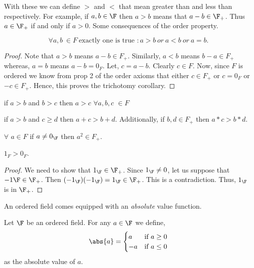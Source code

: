 With these we can define $ > $ and $ < $ that mean greater than and less than
respectively. For example, if $a,b \in \F$ then $ a > b$ means that $a - b \in \F_{+}$. 
Thus $a \in \F_{+}$ if and only if $a > 0$.
Some consequences of the order property.
\begin{Corollary}[name=Trichotomy] 
	\begin{displaymath}
		\forall a,b \ \in F \ \text{exactly one is true } :
	       a > b \ or \ a < b \ or \ a = b.	
	\end{displaymath}
\end{Corollary}
\begin{proof}
	Note that $a > b$ means $ a - b \in F_{+}$. Similarly, $a < b$ means
	$b - a \in F_{+}$ whereas, $a = b$ means $a-b = 0_F$. Let, $c = a - b$.
	Clearly $c \in F$. Now, since $F$ is ordered we know from prop 2 of the
	order axioms that either $c \in F_{+}$ or $c = 0_F$ or $ -c \in F_{+}$.
	Hence, this proves the trichotomy corollary.
\end{proof}
\begin{Corollary}[name = Transitivity]
	if $ a > b$ and $ b > c $ then $ a > c$ $\forall a,b,c$ $\in F$
\end{Corollary}
\begin{Corollary}
	if $ a > b$ and $ c \geq d$ then $ a + c > b + d$. Additionally,
	if $b,d \in F_{+}$ then $ a*c > b*d$.
\end{Corollary}
\begin{Corollary}
    $\forall$ $a \in F$ if $a \neq 0_{\F}$ then $a^2 \in F_{+}$. 
\end{Corollary}
\begin{Corollary}
    $1_{F} > 0_{F}$.
\end{Corollary}
\begin{proof}
    We need to show that $1_{\F} \in \F_{+}$. Since $1_{\F}\neq 0$, let us suppose that $-1\F \in \F_{+}$.
    Then $(-1_{\F})(-1_{\F}) = 1_{\F} \in \F_{+}$. This is a contradiction. Thus, $1_{\F}$ is in $\F_{+}$.
\end{proof}
An ordered field comes equipped with an \emph{absolute} value function.
\begin{Definition}
    Let $\F$ be an ordered field. For any $a\in\F$ we define,
    \begin{equation*}
	\abs{a} = 
	\begin{cases}
	    a &\text{if $a \geq 0$}\\
	    -a &\text{if $a \leq 0$}
	\end{cases}
    \end{equation*}
    as the absolute value of $a$.
\end{Definition}
